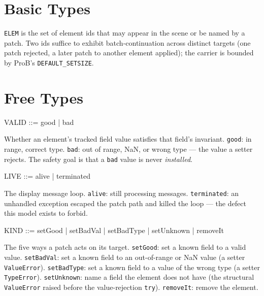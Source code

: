 \documentclass[a4paper,10pt,fleqn]{article}
\begin{document}
\section{Basic Types}

\begin{zed}
  [ELEM]
\end{zed}

\texttt{ELEM} is the set of element ids that may appear in the scene or be
named by a patch.  Two ids suffice to exhibit batch-continuation across
distinct targets (one patch rejected, a later patch to another element
applied); the carrier is bounded by ProB's \texttt{DEFAULT\_SETSIZE}.

\section{Free Types}

\begin{zed}
  VALID ::= good | bad
\end{zed}

Whether an element's tracked field value satisfies that field's invariant.
\texttt{good}: in range, correct type.  \texttt{bad}: out of range, NaN, or
wrong type --- the value a setter rejects.  The safety goal is that a
\texttt{bad} value is never \emph{installed}.

\begin{zed}
  LIVE ::= alive | terminated
\end{zed}

The display message loop.  \texttt{alive}: still processing messages.
\texttt{terminated}: an unhandled exception escaped the patch path and
killed the loop --- the defect this model exists to forbid.

\begin{zed}
  KIND ::= setGood | setBadVal | setBadType | setUnknown | removeIt
\end{zed}

The five ways a patch acts on its target.  \texttt{setGood}: set a known
field to a valid value.  \texttt{setBadVal}: set a known field to an
out-of-range or NaN value (a setter \texttt{ValueError}).  \texttt{setBadType}:
set a known field to a value of the wrong type (a setter \texttt{TypeError}).
\texttt{setUnknown}: name a field the element does not have (the structural
\texttt{ValueError} raised before the value-rejection \texttt{try}).
\texttt{removeIt}: remove the element.
\end{document}
